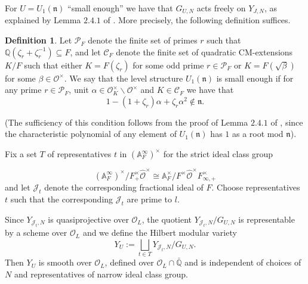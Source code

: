 \documentclass[a4paper,oneside]{amsart}
\theoremstyle{plain}
\theoremstyle{definition}
\newtheorem{define}[thm]{Definition}
\begin{document}
For $U = U_1(\mathfrak{n})$ ``small enough'' we have that $G_{U,N}$ acts freely on $Y_{J,N}$, as explained by Lemma $2.4.1$ of \cite{diamondsasaki}. More precisely, the following definition suffices.

\begin{define}\label{smallenough}
Let $\mathcal{P}_F$ denote the finite set of primes $r$ such that $\mathbb{Q}(\zeta_r+\zeta_r^{-1})\subseteq F$, and let $\mathcal{C}_F$ denote the finite set of quadratic CM-extensions $K/F$ such that either $K = F(\zeta_r)$ for some odd prime $r\in\mathcal{P}_F$ or $K = F(\sqrt{\beta})$ for some $\beta\in \mathcal{O}^{\times}$. We say that the level structure $U_1(\mathfrak{n})$ is small enough if for any prime $r\in \mathcal{P}_F$, unit $\alpha\in\mathcal{O}_K^{\times}\backslash\mathcal{O}^{\times}$ and $K\in \mathcal{C}_F$ we have that \[1-(1+\zeta_r)\alpha+\zeta_r\alpha^2\notin\mathfrak{n}.\]

\noindent (The sufficiency of this condition follows from the proof of Lemma $2.4.1$ of \cite{diamondsasaki}, since the characteristic polynomial of any element of $U_1(\mathfrak{n})$ has $1$ as a root mod $\mathfrak{n}$).
\end{define}

Fix a set $T$ of representatives $t$ in $(\mathbb{A}_F^\infty)^\times$ for the strict ideal class group

\[
(\mathbb{A}_F^\infty)^\times/F_+^\times\hat{\mathcal{O}}^\times \cong \mathbb{A}_F^\times / F^\times \hat{\mathcal{O}}^{\times} F_{\infty, +}^\times
\]
and let $\mathcal{J}_t$ denote the corresponding fractional ideal of $F$. Choose representatives $t$ such that the corresponding $\mathcal{J}_t$ are prime to $l$.

Since $Y_{\mathcal{J}_t,N}$ is quasiprojective over $\mathcal{O}_L$, the quotient $Y_{\mathcal{J}_t,N}/G_{U,N}$ is representable by a scheme over $\mathcal{O}_L$ and we define the Hilbert modular variety
\begin{equation*}
    Y_U := \bigsqcup_{t\in T} Y_{\mathcal{J}_t,N}/G_{U,N}.
\end{equation*}
Then $Y_U$ is smooth over $\mathcal{O}_L$, defined over $\mathcal{O}_L \cap \bar{\mathbb{Q}}$ and is independent of choices of $N$ and representatives of narrow ideal class group.
\end{document}
